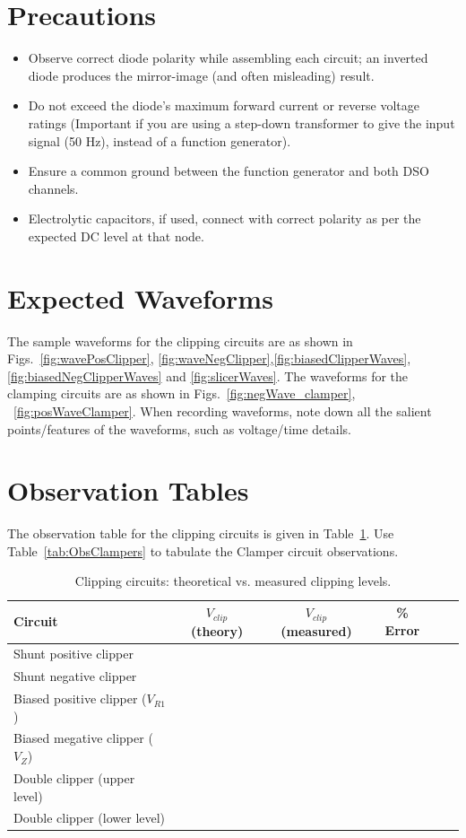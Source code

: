 \section{Precautions}
\begin{itemize}
	\item Observe correct diode polarity while assembling each circuit; an inverted diode produces the mirror-image (and often misleading) result.
	\item Do not exceed the diode's maximum forward current or reverse voltage ratings (Important if you are using a step-down transformer to give the input signal (50 Hz), instead of a function generator).
	\item Ensure a common ground between the function generator and both DSO channels.
	\item Electrolytic capacitors, if used, connect with correct polarity as per the expected DC level at that node.
\end{itemize}
\section{Expected Waveforms}
The sample waveforms for the clipping circuits are as shown in Figs.~\ref{fig:wavePosClipper}, \ref{fig:waveNegClipper},\ref{fig:biasedClipperWaves}, \ref{fig:biasedNegClipperWaves} and \ref{fig:slicerWaves}. The waveforms for the clamping circuits are as shown in Figs.~\ref{fig:negWave_clamper}, ~\ref{fig:posWaveClamper}. When recording waveforms, note down all the salient points/features of the waveforms, such as voltage/time details.

\section{Observation Tables}
The observation table for the clipping circuits is given in Table~\ref{tab:ObsClippers}. Use Table~\ref{tab:ObsClampers} to tabulate the Clamper circuit observations.
\begin{table}[ht!]
	\centering
	\begin{tabular}{@{}lccccc@{}}
		\toprule
		Circuit & $V_{clip}$ (theory) & $V_{clip}$ (measured) & \% Error \\
		\midrule
		Shunt positive clipper &  &  &  \\
		Shunt negative clipper &  &  &  \\
		Biased positive clipper ($V_{R1}$) &  &  &  \\
		Biased megative clipper ($V_{Z}$) &  &  &  \\
		Double clipper (upper level) &  &  &  \\
		Double clipper (lower level) &  &  &  \\
		\bottomrule
	\end{tabular}
	\caption{Clipping circuits: theoretical vs. measured clipping levels.}
	\label{tab:ObsClippers}
\end{table}

